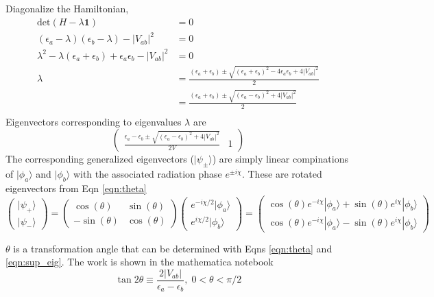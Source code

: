 \documentclass{article}
\begin{document}
Diagonalize the Hamiltonian,
\begin{align}
  \text{det}(H-\lambda\mathbf{1}) &= 0 \\
  (\epsilon_a-\lambda)(\epsilon_b-\lambda) - |V_{ab}|^2 &= 0 \\
  \lambda^2 -\lambda(\epsilon_a+\epsilon_b) + \epsilon_a\epsilon_b
  - |V_{ab}|^2 &= 0 \\
  \lambda &= \frac{(\epsilon_a+\epsilon_b) \pm
    \sqrt{(\epsilon_a+\epsilon_b)^2 -4\epsilon_a\epsilon_b + 4|V_{ab}|^2}}{2}\\
  & = \frac{(\epsilon_a+\epsilon_b) \pm
    \sqrt{(\epsilon_a-\epsilon_b)^2 + 4|V_{ab}|^2}}{2} \nonumber \\
\end{align}
Eigenvectors corresponding to eigenvalues $\lambda$ are
\begin{equation}
  \begin{pmatrix}
    \frac{\epsilon_a-\epsilon_b\pm\sqrt{(\epsilon_a-\epsilon_b)^2+4|V_{ab}|^2}}{2V} & 1
  \end{pmatrix}
  \label{eqn:theta}
\end{equation}
The corresponding generalized eigenvectors ($|\psi_{\pm}\rangle$) are simply
linear compinations of $|\phi_a\rangle$ and $|\phi_b\rangle$
with the associated radiation phase $e^{\pm i\chi}$. These are rotated eigenvectors
from Eqn \eqref{eqn:theta}
\begin{equation}
  \begin{pmatrix}
    |\psi_+\rangle \\
    |\psi_-\rangle
  \end{pmatrix}
  =
  \begin{pmatrix}
    \cos(\theta) & \sin(\theta) \\
    -\sin(\theta)& \cos(\theta)
  \end{pmatrix}
  \begin{pmatrix}
    e^{-i\chi/2}|\phi_a\rangle \\
    e^{i\chi/2}|\phi_b\rangle
  \end{pmatrix}
  =\begin{pmatrix}
  \cos(\theta)e^{-i\chi}|\phi_a\rangle + \sin(\theta) e^{i\chi}|\phi_b\rangle \\
  \cos(\theta)e^{-i\chi}|\phi_a\rangle - \sin(\theta) e^{i\chi}|\phi_b\rangle
  \end{pmatrix}
  \label{eqn:sup_eig}
\end{equation}

$\theta$ is a transformation angle that can be determined with Eqns
\eqref{eqn:theta} and \eqref{eqn:sup_eig}. The work is shown in the mathematica
notebook
\begin{equation}
  \tan 2\theta \equiv \frac{2|V_{ab}|}{\epsilon_a-\epsilon_b},\; 0<\theta<\pi/2
  \label{eqn:angle_transform}
\end{equation}
\end{document}
